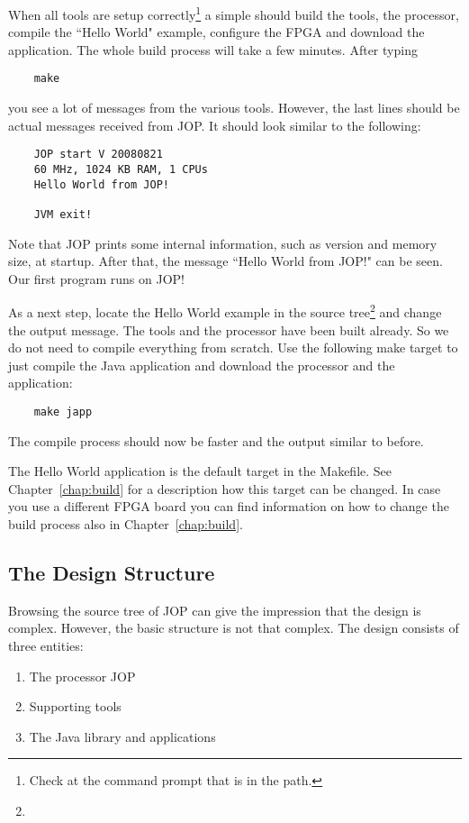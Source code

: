 When all tools are setup correctly\footnote{Check at the command
prompt that  is in the path.} a simple  should
build the tools, the processor, compile the ``Hello World" example,
configure the FPGA and download the application. The whole build
process will take a few minutes. After typing
\begin{lstlisting}
    make
\end{lstlisting}
you see a lot of messages from the various tools. However, the last
lines should be actual messages received from JOP. It should look
similar to the following:
\begin{lstlisting}
    JOP start V 20080821
    60 MHz, 1024 KB RAM, 1 CPUs
    Hello World from JOP!

    JVM exit!
\end{lstlisting}
Note that JOP prints some internal information, such as version and
memory size, at startup. After that, the message ``Hello World from
JOP!" can be seen. Our first program runs on JOP!

As a next step, locate the Hello World example in the source
tree\footnote{}
and change the output message. The tools and the processor have been
built already. So we do not need to compile everything from scratch.
Use the following make target to just compile the Java application
and download the processor and the application:
\begin{lstlisting}
    make japp
\end{lstlisting}
The compile process should now be faster and the output similar to
before.

The Hello World application is the default target in the Makefile.
See Chapter~\ref{chap:build} for a description how this target can be
changed. In case you use a different FPGA board you can find
information on how to change the build process also in
Chapter~\ref{chap:build}.

\subsection{The Design Structure}

Browsing the source tree of JOP can give the impression that the
design is complex. However, the basic structure is not that complex.
The design consists of three entities:
\begin{enumerate}
    \item The processor JOP
    \item Supporting tools
    \item The Java library and applications
\end{enumerate}

